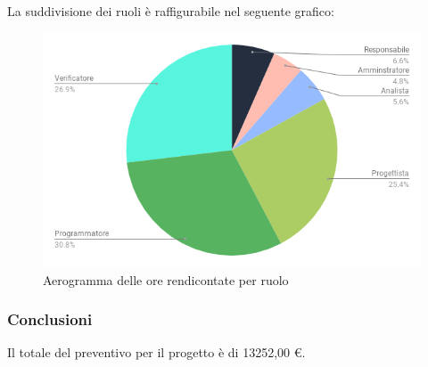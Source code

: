             \pagebreak

        La suddivisione dei ruoli è raffigurabile nel seguente grafico:
            \begin{figure}[H]
                \centering
                \includegraphics[scale=0.6]{immagini/ore_rendicontate_pie.png}
                \caption{Aerogramma delle ore rendicontate per ruolo}
            \end{figure}

        \subsubsection{Conclusioni}Il totale del preventivo per il progetto è di 13252,00 \euro.